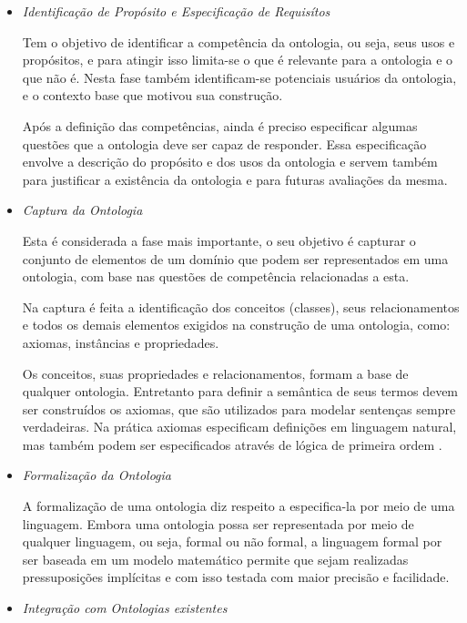 \begin{itemize}
    \item \textit{Identificação de Propósito e Especificação de Requisítos}
    
    Tem o objetivo de identificar a competência da ontologia, ou seja, seus usos
    e propósitos, e para atingir isso limita-se o que é relevante para a ontologia
    e o que não é. Nesta fase também identificam-se potenciais usuários da ontologia,
    e o contexto base que motivou sua construção.
    
    Após a definição das competências, ainda é preciso especificar algumas 
    questões que a ontologia deve ser capaz de responder. Essa especificação 
    envolve a descrição do propósito e dos usos da ontologia e servem também para
    justificar a existência da ontologia e para futuras avaliações da mesma.
    
    \item \textit{Captura da Ontologia}
    
    Esta é considerada a fase mais importante, o seu objetivo é capturar o 
    conjunto de elementos de um domínio que podem ser representados em uma 
    ontologia, com base nas questões de competência relacionadas a esta.
    
    Na captura é feita a identificação dos conceitos (classes), seus 
    relacionamentos e todos os demais elementos exigidos na construção de uma
    ontologia, como: axiomas, instâncias e propriedades.
    
    Os conceitos, suas propriedades e relacionamentos, formam a base de qualquer
    ontologia. Entretanto para definir a semântica de seus termos devem ser 
    construídos os axiomas, que são utilizados para modelar sentenças sempre
    verdadeiras. Na prática axiomas especificam definições em linguagem natural,
    mas também podem ser especificados através de lógica de primeira ordem 
    \cite{falbo1998integracao}.
    
    \item \textit{Formalização da Ontologia}
    
    A formalização de uma ontologia diz respeito a especifica-la por meio de uma
    linguagem. Embora uma ontologia possa ser representada por meio de qualquer 
    linguagem, ou seja, formal ou não formal, a linguagem formal por ser baseada
    em um modelo matemático permite que sejam realizadas pressuposições 
    implícitas e com isso testada com maior precisão e facilidade.
    
    \item \textit{Integração com Ontologias existentes}
    

\end{itemize}
